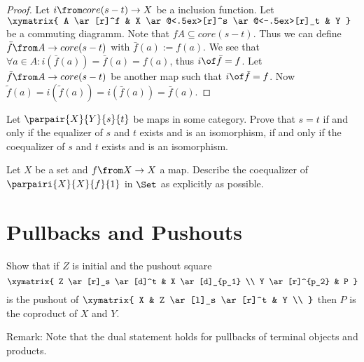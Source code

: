 \begin{answer}
  \begin{proof}
    Let $i \from core(s-t) \to X$ be a inclusion function. Let
    $\xymatrix{
      A \ar[r]^f & X \ar@<.5ex>[r]^s \ar@<-.5ex>[r]_t & Y
    }$
    be a commuting diagramm. Note that $f A \subseteq core(s-t)$.
    Thus we can define $\bar{f} \from A \to core(s-t)$ with $\bar{f}(a) := f(a)$.
    We see that $\forall a \in A: i(\bar{f}(a))=\bar{f}(a)=f(a)$, thus $i \of \bar{f} = f$.
    Let $\tilde{f} \from A \to core(s-t)$ be another map such that $i \of \tilde{f} = f$.
    Now $\tilde{f}(a) = i(\tilde{f}(a)) = i(\bar{f}(a)) = \bar{f}(a)$.
  \end{proof}
\end{answer}

\begin{exercise}
  Let $\parpair{X}{Y}{s}{t}$ be maps in some category.  Prove that $s = t$ if
  and only if the equalizer of $s$ and $t$ exists and is an isomorphism, if
  and only if the coequalizer of $s$ and $t$ exists and is an isomorphism.
\end{exercise}

\begin{exercise}
  Let $X$ be a set and $f\from X \to X$ a map.  Describe the coequalizer of
  $\parpairi{X}{X}{f}{1}$ in $\Set$ as explicitly as possible.
\end{exercise}

\section{Pullbacks and Pushouts}

\begin{exercise}
  Show that if $Z$ is initial and the pushout square
  \[ \xymatrix{
    Z \ar[r]_s \ar[d]^t & X \ar[d]_{p_1} \\
    Y \ar[r]^{p_2} & P
  } \]
  is the pushout of
  $ \xymatrix{
    X & Z \ar[l]_s \ar[r]^t & Y \\
  } $
  then $P$ is the coproduct of $X$ and $Y$.

  Remark: Note that the dual statement holds for pullbacks of terminal objects and products.
\end{exercise}

